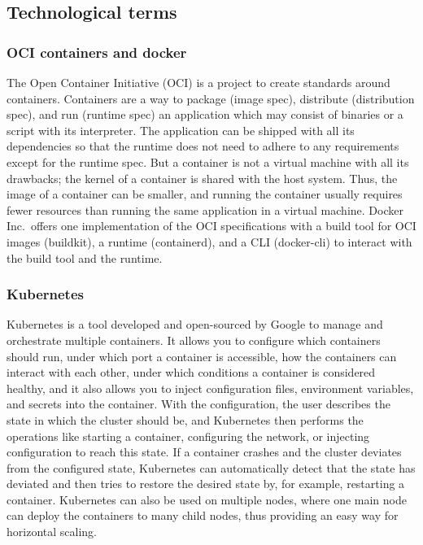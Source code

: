 \documentclass[conference]{IEEEtran}
\begin{document}
\subsection{Technological terms}

\subsubsection{OCI containers and docker}

The Open Container Initiative (OCI) is a project to create standards around containers\cite{oci-website}.
Containers are a way to package (image spec), distribute (distribution spec), and run (runtime spec) an application
which may consist of binaries or a script with its interpreter.
The application can be shipped with all its dependencies so that the runtime does not need to adhere to any
requirements except for the runtime spec.
But a container is not a virtual machine with all its drawbacks; the kernel of a container is shared with the host system.
Thus, the image of a container can be smaller, and running the container usually requires fewer resources than running the same application
in a virtual machine.
Docker Inc.\ offers one implementation of the OCI specifications with a build tool for OCI images (buildkit), a runtime (containerd),
and a CLI (docker-cli) to interact with the build tool and the runtime\cite{docker-container-runtime-website}.

\subsubsection{Kubernetes}

Kubernetes is a tool developed and open-sourced by Google to manage and orchestrate multiple containers.
It allows you to configure which containers should run, under which port a container is accessible,
how the containers can interact with each other, under which conditions a container is considered healthy, and it also allows
you to inject configuration files, environment variables, and secrets into the container.
With the configuration, the user describes the state in which the cluster should be, and Kubernetes then performs the
operations like starting a container, configuring the network, or injecting configuration to reach this state.
If a container crashes and the cluster deviates from the configured state, Kubernetes can automatically detect that
the state has deviated and then tries to restore the desired state by, for example, restarting a container.
Kubernetes can also be used on multiple nodes, where one main node can deploy the containers to many child nodes,
thus providing an easy way for horizontal scaling.
\end{document}
